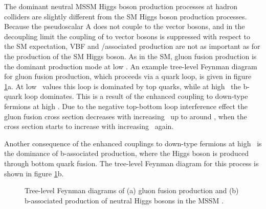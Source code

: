 The dominant neutral MSSM Higgs boson production processes at hadron colliders
are slightly different from the \ac{SM} Higgs boson production processes. 
Because the pseudoscalar A does not couple to the
vector bosons, and in the decoupling limit the coupling of \PHiggs to vector
bosons is suppressed with respect to the \ac{SM} expectation, VBF and \PW/\PZ associated
production are not as important as for the production of the \ac{SM} Higgs boson. As in the \ac{SM}, gluon fusion production is 
the dominant production mode at low \tanb.
An example tree-level Feynman diagram for gluon fusion production, which proceeds via
a quark loop, is given in figure \ref{fig:production_mssm}a.
At low \tanb~values this loop is dominated by top quarks, while at 
high \tanb~the b-quark loop dominates. This is a result of the enhanced coupling to down-type fermions at high \tanb. 
Due to the negative top-bottom loop interference effect the gluon fusion cross section decreases with increasing \tanb~up
to around , when the cross section starts to increase with increasing \tanb~again.

Another consequence of the enhanced couplings to down-type fermions at high \tanb~is the dominance of b-associated production, where the Higgs boson is produced through
bottom quark fusion. The tree-level Feynman diagram for this process is shown in figure \ref{fig:production_mssm}b.

\begin{figure}[h!]
\begin{center}
\end{center}
\caption[Tree-level Feynman diagrams of gluon fusion and b-associated production of neutral Higgs bosons in the MSSM]{Tree-level Feynman diagrams of (a) gluon fusion production and (b) b-associated
production of neutral Higgs bosons in the MSSM \cite{CMS-PAS-HIG-16-037}.}
\label{fig:production_mssm}
\end{figure}

